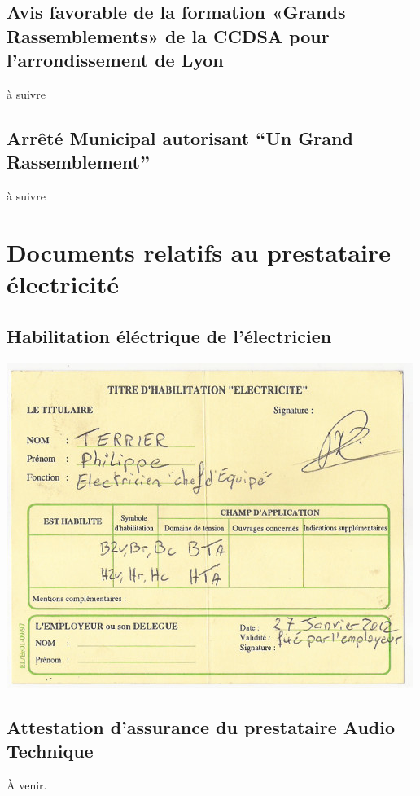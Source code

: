 \documentclass[hidelinks, paper=a4, fontsize=13pt]{report}
\begin{document}
\subsection{Avis favorable de la formation «Grands Rassemblements» de la CCDSA pour l’arrondissement de Lyon}
à suivre

\subsection{Arrêté Municipal autorisant “Un Grand Rassemblement”}
à suivre

\section{Documents relatifs au prestataire électricité}
\subsection{Habilitation éléctrique de l'électricien}
\begin{center}
\includegraphics[scale=0.8]{Annexes/Documents/HabilitationPhilty}
\end{center}

\subsection{Attestation d'assurance du prestataire Audio Technique}
À venir.
%
\newpage
\end{document}
